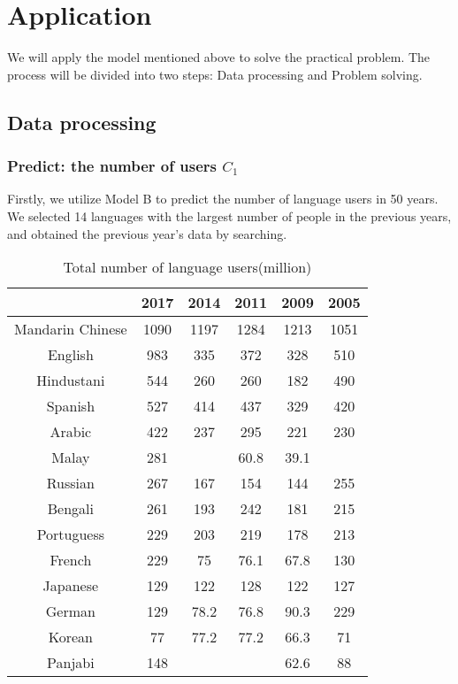\documentclass{mcmthesis}
\begin{document}
\section{Application}
We will apply the model mentioned above to solve the practical problem. The process will be divided into two steps: Data processing and Problem solving.

\subsection{Data processing}
\subsubsection{Predict: the number of users $C_1$}
Firstly, we utilize Model B to predict the number of language users in 50 years.
We selected 14 languages with the largest number of people in the previous years, and obtained the previous year's data by searching.
\begin{table}[!ht]
  \centering
  \begin{tabular}{ c | c | c | c | c | c }
      \hline
       & 2017 \cite{7} & 2014 \cite{8} & 2011 \cite{9} & 2009 \cite{10} & 2005 \cite{11} \\ \hline
      Mandarin Chinese& 1090 & 1197 & 1284 & 1213 & 1051 \\ \hline
      English & 983 & 335 & 372 & 328 & 510 \\  \hline
      Hindustani & 544 & 260 & 260 & 182 & 490 \\  \hline
      Spanish & 527 & 414 & 437 & 329 & 420 \\  \hline
      Arabic & 422 & 237 & 295 & 221 & 230 \\  \hline
      Malay & 281 &  & 60.8 & 39.1 &  \\  \hline
      Russian & 267 & 167 & 154 & 144 & 255 \\  \hline
      Bengali & 261 & 193 & 242 & 181 & 215 \\  \hline
      Portuguess & 229 & 203 & 219 & 178 & 213 \\  \hline
      French & 229 & 75 & 76.1 & 67.8 & 130 \\  \hline
      Japanese & 129 & 122 & 128 & 122 & 127 \\  \hline
      German & 129 & 78.2 & 76.8 & 90.3 & 229 \\  \hline
      Korean & 77 & 77.2 & 77.2 & 66.3 & 71 \\  \hline
      Panjabi & 148 &  &  & 62.6 & 88 \\  \hline
  \end{tabular}
  \caption{Total number of language users(million)}
  \label{Total number of language users(million)}
\end{table}
\end{document}
